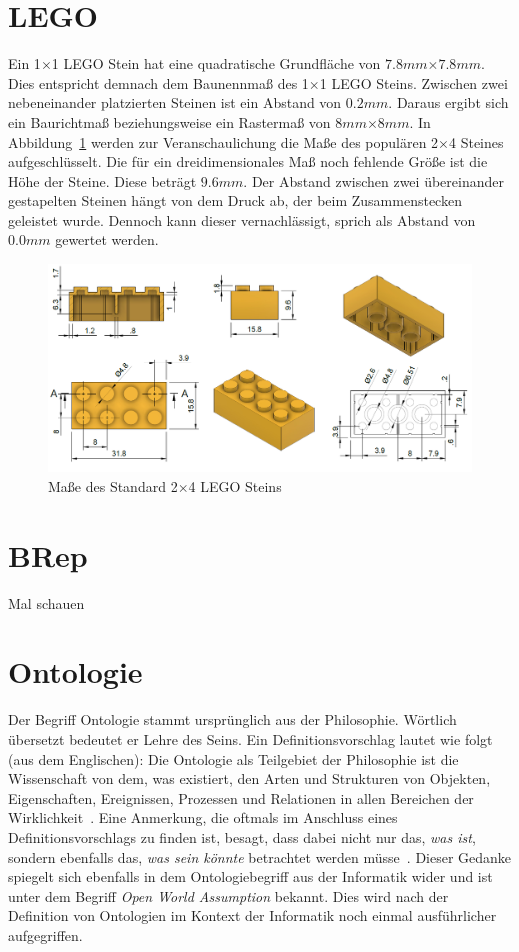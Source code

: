 \section{LEGO}\label{basics:lego}
Ein 1$\times$1 LEGO Stein hat eine quadratische Grundfläche von \(7.8mm\)$\times$\(7.8mm\).
Dies entspricht demnach dem Baunennmaß des 1$\times$1 LEGO Steins.
Zwischen zwei nebeneinander platzierten Steinen ist ein Abstand von  \(0.2mm\).
Daraus ergibt sich ein Baurichtmaß beziehungsweise ein Rastermaß von \(8mm\)$\times$\(8mm\).
In Abbildung~\ref{fig:basics:Lego 2x4 Brick} werden zur Veranschaulichung die Maße des populären 2$\times$4 Steines aufgeschlüsselt.
Die für ein dreidimensionales Maß noch fehlende Größe ist die Höhe der Steine.
Diese beträgt \(9.6mm\).
Der Abstand zwischen zwei übereinander gestapelten Steinen hängt von dem Druck ab, der beim Zusammenstecken geleistet wurde.
Dennoch kann dieser vernachlässigt, sprich als Abstand von \(0.0mm\) gewertet werden.

\begin{figure}[h]
    \centering
    \includegraphics[width=0.8\columnwidth]{fig/LEGO 2x4 Brick horizontal.png}
    \caption{Maße des Standard 2$\times$4 LEGO Steins~\cite{LEGOBric2:online}}\label{fig:basics:Lego 2x4 Brick}
\end{figure}

\section{BRep}\label{basics:brep}
Mal schauen

\section{Ontologie}\label{basics:ontologie}
Der Begriff Ontologie stammt ursprünglich aus der Philosophie.
Wörtlich übersetzt bedeutet er \glqq{}Lehre des Seins\grqq{}.
Ein Definitionsvorschlag lautet wie folgt (aus dem Englischen):
\glqq{}Die Ontologie als Teilgebiet der Philosophie ist die Wissenschaft von dem, was existiert, den Arten und Strukturen von Objekten, Eigenschaften, Ereignissen, Prozessen und Relationen in allen Bereichen der Wirklichkeit\grqq{}~\cite{Ontology}.
Eine Anmerkung, die oftmals im Anschluss eines Definitionsvorschlags zu finden ist, besagt, dass dabei nicht nur das, \textit{was ist}, sondern ebenfalls das, \textit{was sein könnte} betrachtet werden müsse~\cite{Ontology}\cite{OntologieDefinitionLMU:online}.
Dieser Gedanke spiegelt sich ebenfalls in dem Ontologiebegriff aus der Informatik wider und ist unter dem Begriff \textit{Open World Assumption} bekannt.
Dies wird nach der Definition von Ontologien im Kontext der Informatik noch einmal ausführlicher aufgegriffen.

